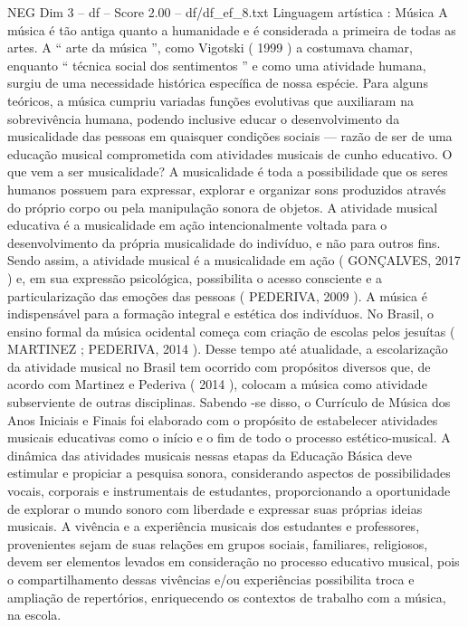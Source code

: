 \begin{textsample}{NEG Dim 3 – df – Score 2.00 – df/df\_ef\_8.txt}  \label{ex:f3_neg_169}
Linguagem artística : Música A música é tão antiga quanto a humanidade e é considerada a primeira de todas as artes.
A “ arte da música ”, como Vigotski ( 1999 ) a costumava chamar, enquanto “ técnica social dos sentimentos ” e como uma atividade humana, surgiu de uma necessidade histórica específica de nossa espécie.
Para alguns teóricos, a música cumpriu variadas funções evolutivas que auxiliaram na sobrevivência humana, podendo inclusive educar o desenvolvimento da musicalidade das pessoas em quaisquer condições sociais — razão de ser de uma educação musical comprometida com atividades musicais de cunho educativo.
O que vem a ser musicalidade?
A musicalidade é toda a possibilidade que os seres humanos possuem para expressar, explorar e organizar sons produzidos através do próprio corpo ou pela manipulação sonora de objetos.
A atividade musical educativa é a musicalidade em ação intencionalmente voltada para o desenvolvimento da própria musicalidade do indivíduo, e não para outros fins.
Sendo assim, a atividade musical é a musicalidade em ação ( GONÇALVES, 2017 ) e, em sua expressão psicológica, possibilita o acesso consciente e a particularização das emoções das pessoas ( PEDERIVA, 2009 ).
A música é indispensável para a formação integral e estética dos indivíduos.
No Brasil, o ensino formal da música ocidental começa com criação de escolas pelos jesuítas ( MARTINEZ ; PEDERIVA, 2014 ).
Desse tempo até atualidade, a escolarização da atividade musical no Brasil tem ocorrido com propósitos diversos que, de acordo com Martinez e Pederiva ( 2014 ), colocam a música como atividade subserviente de outras disciplinas.
Sabendo -se disso, o Currículo de Música dos Anos Iniciais e Finais foi elaborado com o propósito de estabelecer atividades musicais educativas como o início e o fim de todo o processo estético-musical.
A dinâmica das atividades musicais nessas etapas da Educação Básica deve estimular e propiciar a pesquisa sonora, considerando aspectos de possibilidades vocais, corporais e instrumentais de estudantes, proporcionando a oportunidade de explorar o mundo sonoro com liberdade e expressar suas próprias ideias musicais.
A vivência e a experiência musicais dos estudantes e professores, provenientes sejam de suas relações em grupos sociais, familiares, religiosos, devem ser elementos levados em consideração no processo educativo musical, pois o compartilhamento dessas vivências e/ou experiências possibilita troca e ampliação de repertórios, enriquecendo os contextos de trabalho com a música, na escola.

\end{textsample}
